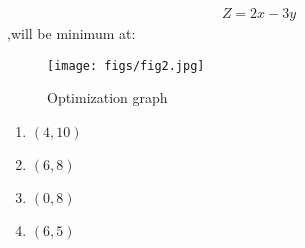 \documentclass{article}
\begin{document}
\begin{enumerate}
\begin{align}
	Z=2x-3y
\end{align}
		,will be minimum at:
\begin{figure}[h]
    \centering{}
     \texttt{[image: figs/fig2.jpg]}
	\caption{Optimization graph}
     \label{fig:23/2021/041}                       
\end{figure}
\begin{enumerate}
    \item $(4,10)$
    \item $(6,8)$
    \item $(0,8)$
    \item $(6,5)$
\end{enumerate}
    
\end{enumerate}
\end{document}
